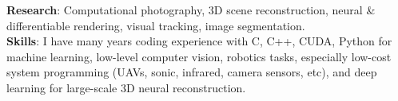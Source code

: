 

\begin{cvparagraph}

\textbf{Research}: Computational photography, 3D scene reconstruction, neural \& differentiable rendering, visual tracking, image segmentation. \\
\textbf{Skills}: I have many years coding experience with C, C++, CUDA, Python for machine learning, low-level computer vision, robotics tasks, especially low-cost system programming (UAVs, sonic, infrared, camera sensors, etc), and deep learning for large-scale 3D neural reconstruction.  
\end{cvparagraph}
